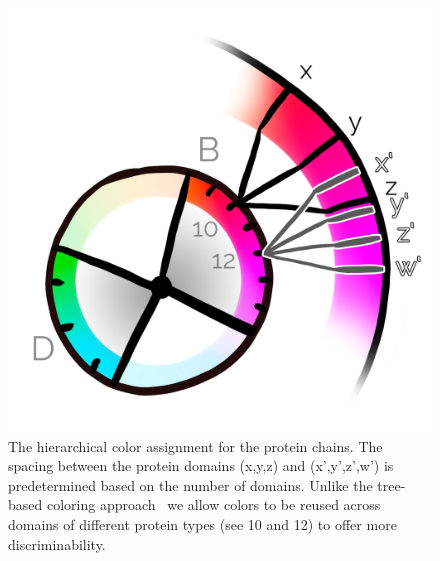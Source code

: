 \documentclass[review,journal]{vgtc}         %
\begin{document}
	
	
	\begin{figure}
		\centering
		\includegraphics[width=0.4\linewidth]{Figures/overlap}
		\caption{The hierarchical color assignment for the protein chains. 
			The spacing between the protein domains (x,y,z) and (x',y',z',w') is predetermined based on the number of domains. 
			Unlike the tree-based coloring approach~\cite{tennekes2014tree} we allow colors to be reused across domains of different protein types (see 10 and 12) to offer more discriminability.
		}
		\label{fig:overlap}
	\end{figure}
	
\end{document}
